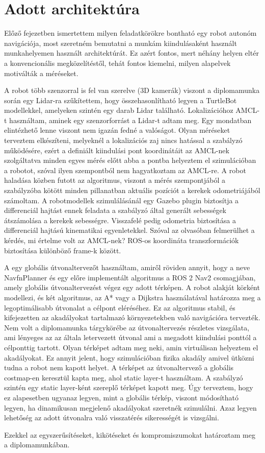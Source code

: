 \section{Adott architektúra}
Előző fejezetben ismertettem milyen feladatkörökre bontható egy robot autonóm navigációja, most szeretném bemutatni a munkám kiindulásaként használt munkahelyemen használt architektúrát. Ez azért fontos, mert néhány helyen eltér a konvencionális megközelítéstől, tehát fontos kiemelni, milyen alapelvek motiválták a méréseket.

A robot több szenzorral is fel van szerelve (3D kamerák) viszont a diplomamunka során egy Lidar-ra szűkítettem, hogy összehasonlítható legyen a TurtleBot modellekkel, amelyeken szintén egy darab Lidar található. Lokalizációhoz AMCL-t használtam, aminek egy szenzorforrást a Lidar-t adtam meg. Egy mondatban elintézhető lenne viszont nem igazán fedné a valóságot. Olyan méréseket terveztem elkészíteni, melyeknél a lokalizációs zaj nincs hatással a szabályzó működésére, ezért a definiált kiindulási pont koordinátáit az AMCL-nek szolgáltatva minden egyes mérés előtt abba a pontba helyeztem el szimulációban a robotot, szóval ilyen szempontból nem hagyatkoztam az AMCL-re. A robot haladása közben futott az algoritmus, viszont a mérés szempontjából a szabályzóba kötött minden pillanatban aktuális pozíciót a kerekek odometriájából számoltam. A robotmodellek szimulálásánál egy Gazebo plugin biztosítja a differenciál hajtást ennek feladata a szabályzó által generált sebességek átszámolása a kerekek sebességre. Visszafelé pedig odometria biztosítása a differenciál hajtású kinematikai egyenletekkel. Szóval az olvasóban felmerülhet a kérdés, mi értelme volt az AMCL-nek? ROS-os koordináta transzformációk biztosítása különböző frame-k között.

A egy globális útvonaltervezőt használtam, amiről röviden annyit, hogy a neve NavfnPlanner és egy előre implementált algoritmus a ROS 2 Nav2 csomagjában, amely globális útvonaltervezést végez egy adott térképen. A robot alakját körként modellezi, és két algoritmus, az A* vagy a Dijkstra használatával határozza meg a legoptimálisabb útvonalat a célpont eléréséhez. Ez az algoritmus stabil, és kifejezetten az akadályokat tartalmazó környezetekben való navigációra tervezték. Nem volt a diplomamunka tárgykörébe az útvonaltervezés részletes vizsgálata, ami lényeges az az általa letervezett útvonal ami a megadott kiindulási ponttól a célponttig tartott. Olyan térképet adtam meg neki, amin virtuálisan helyeztem el akadályokat. Ez annyit jelent, hogy szimulációban fizika akadály amivel ütközni tudna a robot nem kapott helyet. A térképet az útvonaltervező a globális costmap-en keresztül kapta meg, ahol static layer-t használtam. A szabályzó szintén egy static layer-ként szereplő térképet kapott meg. Úgy terveztem, hogy ez alapesetben ugyanaz legyen, mint a globális térkép, viszont módosítható legyen, ha dinamikusan megjelenő akadályokat szeretnék szimulálni. Azaz legyen lehetőség az adott útvonalra való visszatérés sikerességét is vizsgálni.

Ezekkel az egyszerűsítéseket, kikötéseket és kompromiszumokat határoztam meg a diplomamunkában.
